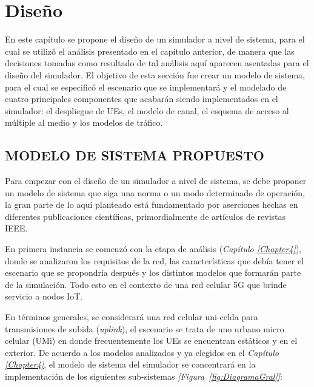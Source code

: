 
\chapter{Diseño} %

\label{Chapter5} %

En este capítulo se propone el diseño de un simulador a nivel de sistema, para el cual se utilizó el análisis presentado en el capítulo anterior, de manera que las decisiones tomadas como resultado de tal análisis aquí aparecen asentadas para el diseño del simulador. El objetivo  de esta sección fue crear un modelo de sistema, para el cual se especificó el escenario que se implementará y el modelado de cuatro principales componentes que acabarán siendo implementados en el simulador: el despliegue de UEs, el modelo de canal, el esquema de acceso al múltiple al medio y los modelos de tráfico.\newline



\section{MODELO DE SISTEMA PROPUESTO}

Para empezar con el diseño de un simulador a nivel de sistema, se debe proponer un modelo de sistema que siga una norma o un modo determinado de operación, la gran parte de lo aquí planteado está fundamentado por aserciones hechas en diferentes publicaciones científicas, primordialmente de artículos de revistas IEEE.

En primera instancia se comenzó con la etapa de análisis (\textit{Capítulo \ref{Chapter4}}), donde se analizaron los requisitos de la red, las características que debía tener el escenario que se propondría después y los distintos modelos que formarán parte de la simulación. Todo esto en el contexto de una red celular 5G que brinde servicio a nodos IoT.

En términos generales, se considerará una red celular uni-celda para transmisiones de subida (\textit{uplink}), el escenario se trata de uno urbano micro celular (UMi) en donde frecuentemente los UEs se encuentran estáticos y en el exterior. De acuerdo a los modelos analizados y ya elegidos en el \textit{Capítulo \ref{Chapter4}}, el modelo de sistema del simulador se concentrará en la implementación de los siguientes sub-sistemas \textit{[Figura~\ref{fig:DiagramaGral}]}:

